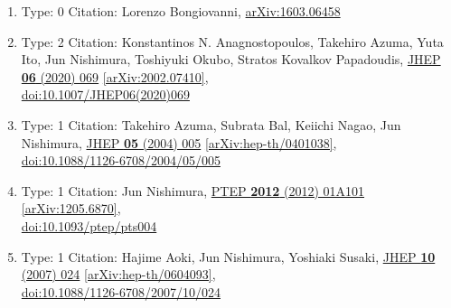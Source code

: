 \documentclass[a4paper,10pt]{article}
\begin{document}
\begin{enumerate}
\begin{enumerate}
  \item Type: 0 Citation: Lorenzo Bongiovanni, \href{https://arxiv.org/abs/1603.06458}{arXiv:1603.06458}
  \item Type: 2 Citation: Konstantinos N. Anagnostopoulos, Takehiro Azuma, Yuta Ito, Jun Nishimura, Toshiyuki Okubo, Stratos Kovalkov Papadoudis, \href{https://www.doi.org/10.1007/JHEP06(2020)069}{JHEP {\bf 06} (2020) 069}  \href{https://arxiv.org/abs/2002.07410}{[arXiv:2002.07410]},\\\href{https://www.doi.org/10.1007/JHEP06(2020)069}{doi:10.1007/JHEP06(2020)069}
  \item Type: 1 Citation: Takehiro Azuma, Subrata Bal, Keiichi Nagao, Jun Nishimura, \href{https://www.doi.org/10.1088/1126-6708/2004/05/005}{JHEP {\bf 05} (2004) 005}  \href{https://arxiv.org/abs/hep-th/0401038}{[arXiv:hep-th/0401038]},\\\href{https://www.doi.org/10.1088/1126-6708/2004/05/005}{doi:10.1088/1126-6708/2004/05/005}
  \item Type: 1 Citation: Jun Nishimura, \href{https://www.doi.org/10.1093/ptep/pts004}{PTEP {\bf 2012} (2012) 01A101}  \href{https://arxiv.org/abs/1205.6870}{[arXiv:1205.6870]},\\\href{https://www.doi.org/10.1093/ptep/pts004}{doi:10.1093/ptep/pts004}
  \item Type: 1 Citation: Hajime Aoki, Jun Nishimura, Yoshiaki Susaki, \href{https://www.doi.org/10.1088/1126-6708/2007/10/024}{JHEP {\bf 10} (2007) 024}  \href{https://arxiv.org/abs/hep-th/0604093}{[arXiv:hep-th/0604093]},\\\href{https://www.doi.org/10.1088/1126-6708/2007/10/024}{doi:10.1088/1126-6708/2007/10/024}

\end{enumerate}
\end{enumerate}
\end{document}
